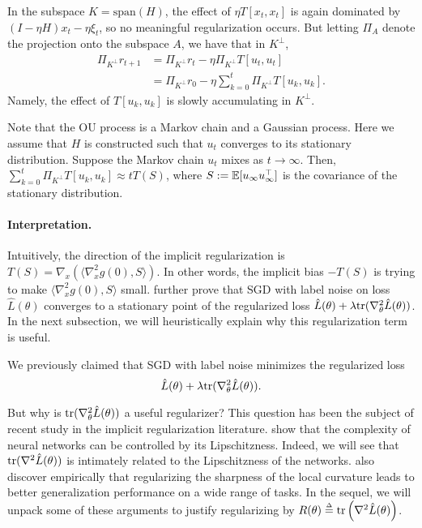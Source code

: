 In the subspace $K = \text{span}(H)$, the effect of $\eta T [x_t,x_t]$ is again dominated by $(I-\eta H)x_t - \eta \xi_t$, so no meaningful regularization occurs. But letting $\Pi_{A}$ denote the projection onto the subspace $A$, we have that in $K^\perp$,
\begin{align}
\Pi_{K^\perp}r_{t+1} &= \Pi_{K^\perp}r_t - \eta \Pi_{K^\perp} T[u_t,u_t]\\
&=\Pi_{K^\perp}r_0 - \eta \sum_{k=0}^{t}\Pi_{K^\perp}T[u_k,u_k].
\end{align}
Namely, the effect of $T[u_k,u_k]$ is slowly accumulating in ${K^\perp}$.

Note that the OU process is a Markov chain and a Gaussian process. Here we assume that $H$ is constructed such that $u_t$ converges to its stationary distribution. Suppose the Markov chain $u_t$ mixes as $t\rightarrow \infty$. Then, $\sum_{k=0}^{t}\Pi_{K^\perp}T[u_k,u_k] \approx tT(S)$, where $S:=\operatorname*{\mathbb{E}}[u_{\infty}u_{\infty}^\top]$ is the covariance of the stationary distribution.


\paragraph{Interpretation.} Intuitively, the direction of the implicit regularization is $T(S) = \nabla_x \left(\langle\nabla_x^2g(0), S\rangle\right)$. In other words, the implicit bias $-T(S)$ is trying to make $\langle\nabla^2_x g(0), S\rangle$ small. \cite{damian2021label} further prove that SGD with label noise on loss $\hat{L}(\theta)$ converges to a stationary point of the regularized loss $\hat{L}(\theta) + \lambda \textup{tr}(\nabla^2_\theta \hat{L}(\theta))$. In the next subsection, we will heuristically explain why this regularization term is useful.

We previously claimed that SGD with label noise minimizes the regularized loss 
\begin{equation}
    \hat{L}(\theta) + \lambda \textup{tr}(\nabla^2_\theta \hat{L}(\theta)).
\end{equation} 

But why is $\textup{tr}(\nabla^2_\theta \hat{L}(\theta))$ a useful regularizer? This question has been the subject of recent study in the implicit regularization literature. \cite{wei2019improved} show that the complexity of neural networks can be controlled by its Lipschitzness. Indeed, we will see that $\textup{tr}(\nabla^2\hat{L}(\theta))$ is intimately related to the Lipschitzness of the networks. \cite{foret2020sharpness} also discover empirically that regularizing the sharpness of the local curvature leads to better generalization performance on a wide range of tasks. In the sequel, we will unpack some of these arguments to justify regularizing by $R(\theta) \defeq \textup{tr}\left (\nabla^2 \hat{L}(\theta) \right )$.


